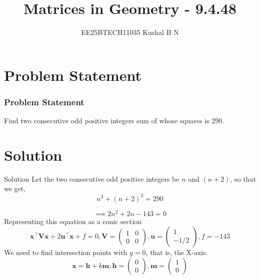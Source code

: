 \documentclass{beamer}
\title{Matrices in Geometry - 9.4.48}
\author{EE25BTECH11035 Kushal B N}
\date{}
\let\vec\mathbf
\theoremstyle{remark}
\newcommand{\myvec}[1]{\ensuremath{\begin{pmatrix}#1\end{pmatrix}}}
\begin{document}
\maketitle

\section{Problem Statement}
\begin{frame}
\frametitle{Problem Statement}
Find two consecutive odd positive integers sum of whose squares is 290.
\end{frame}

\section{Solution}
\begin{frame}{Solution}
Let the two consecutive odd positive integers be $n$ and $(n+2)$, so that we get,
\begin{equation}
    n^2 + (n+2)^2 = 290
\end{equation}

\begin{equation}
    \implies 2n^2 + 2n - 143 = 0
\end{equation}
Representing this equation as a conic section
\begin{equation}
    \vec{x}^{\top}\vec{V}\vec{x} + 2\vec{u}^{\top}\vec{x} + f = 0, \vec{V} = \myvec{1&0\\0&0}, \vec{u} = \myvec{1\\-1/2}, f = -143
\end{equation}
We need to find intersection points with $y = 0$, that is, the X-axis.
\begin{equation}
    \vec{x} = \vec{h} + k\vec{m}, \vec{h} = \myvec{0\\0}, \vec{m} = \myvec{1\\0}
\end{equation}
\end{frame}
\end{document}
